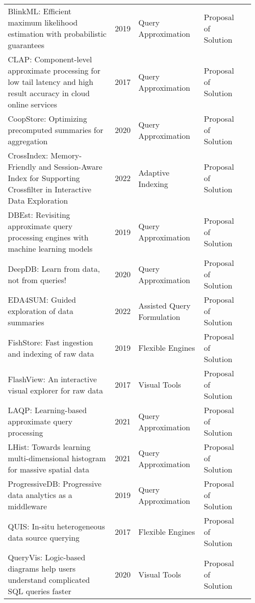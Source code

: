 \begin{longtable}{p{18em} l l l l}
{BlinkML}: {Efficient} maximum likelihood estimation with probabilistic guarantees & 2019 & Query Approximation & Proposal of Solution & \cite{10.1145/3299869.3300077}\\ 
{CLAP}: {Component}-level approximate processing for low tail latency and high result accuracy in cloud online services & 2017 & Query Approximation & Proposal of Solution & \cite{7812758}\\ 
{CoopStore}: {Optimizing} precomputed summaries for aggregation & 2020 & Query Approximation & Proposal of Solution & \cite{gan_coopstore_2020}\\ 
{CrossIndex}: {Memory}-{Friendly} and {Session}-{Aware} {Index} for {Supporting} {Crossfilter} in {Interactive} {Data} {Exploration} & 2022 & Adaptive Indexing & Proposal of Solution & \cite{xia_crossindex_2022}\\ 
{DBEst}: {Revisiting} approximate query processing engines with machine learning models & 2019 & Query Approximation & Proposal of Solution & \cite{10.1145/3299869.3324958}\\ 
{DeepDB}: {Learn} from data, not from queries! & 2020 & Query Approximation & Proposal of Solution & \cite{10.14778/3384345.3384349}\\ 
{EDA4SUM}: {Guided} exploration of data summaries & 2022 & Assisted Query Formulation & Proposal of Solution & \cite{10.14778/3554821.3554851}\\ 
{FishStore}: {Fast} ingestion and indexing of raw data & 2019 & Flexible Engines & Proposal of Solution & \cite{10.14778/3352063.3352100}\\ 
{FlashView}: {An} interactive visual explorer for raw data & 2017 & Visual Tools & Proposal of Solution & \cite{10.14778/3137765.3137796}\\ 
{LAQP}: {Learning}-based approximate query processing & 2021 & Query Approximation & Proposal of Solution & \cite{ZHANG20211113}\\ 
{LHist}: {Towards} learning multi-dimensional histogram for massive spatial data & 2021 & Query Approximation & Proposal of Solution & \cite{9458896}\\ 
{ProgressiveDB}: {Progressive} data analytics as a middleware & 2019 & Query Approximation & Proposal of Solution & \cite{berg_progressivedb_2019}\\ 
{QUIS}: {In}-situ heterogeneous data source querying & 2017 & Flexible Engines & Proposal of Solution & \cite{10.14778/3137765.3137798}\\ 
{QueryVis}: {Logic}-based diagrams help users understand complicated {SQL} queries faster & 2020 & Visual Tools & Proposal of Solution & \cite{10.1145/3318464.3389767}\\ 

\end{longtable}
